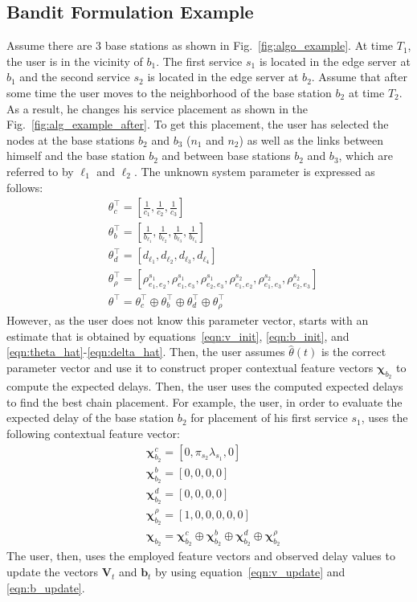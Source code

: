\subsection{Bandit Formulation Example}
Assume there are $3$ base stations as shown in Fig.~\ref{fig:algo_example}. At time $T_1$, the user is in the vicinity of $b_1$. The first service $s_1$ is located in the edge server at $b_1$ and the second service $s_2$ is located in the edge server at $b_2$. Assume that after some time the user moves to the neighborhood of the base station $b_2$ at time $T_2$. As a result, he changes his service placement as shown in the  Fig.~\ref{fig:alg_example_after}. To get this placement, the user has selected the nodes at the base stations $b_2$ and $b_3$ ($n_1$ and $n_2$) as well as the links between himself and the base station $b_2$ and between base stations $b_2$ and $b_3$, which are referred to by $\ell_1$ and $\ell_2$. The unknown system parameter is expressed as follows:
\begin{align*}
	& \theta_{c}^{\intercal} = [\frac{1}{c_1}, \frac{1}{c_2}, \frac{1}{c_3}] \\
	& \theta_{b}^{\intercal} = [\frac{1}{b_{\ell_1}}, \frac{1}{b_{\ell_2}}, \frac{1}{b_{\ell_3}}, \frac{1}{b_{\ell_4}}] \\
	& \theta_{d}^{\intercal} = [d_{\ell_1}, d_{\ell_2}, d_{\ell_3}, d_{\ell_4}] \\
	& \theta_{\rho}^{\intercal} = [\rho_{e_1,e_2}^{s_1}, \rho_{e_1,e_3}^{s_1}, \rho_{e_2,e_3}^{s_1}, \rho_{e_1,e_2}^{s_2}, \rho_{e_1,e_3}^{s_2}, \rho_{e_2,e_3}^{s_2}] \\
	& \theta^{\intercal} = \theta_{c}^{\intercal} \oplus \theta_{b}^{\intercal} \oplus \theta_{d}^{\intercal} \oplus \theta_{\rho}^{\intercal}
\end{align*}
However, as the user does not know this parameter vector, starts with an estimate that is obtained by equations~\eqref{eqn:v_init}, \eqref{eqn:b_init}, and \eqref{eqn:theta_hat}-\eqref{eqn:delta_hat}.
Then, the user assumes $\hat{\theta}(t)$ is the correct parameter vector and use it to construct proper contextual feature vectors $\pmb{\chi}_{b_{2}}$ to compute the expected delays. Then, the user uses the computed expected delays to find the best chain placement. For example, the user, in order to evaluate the expected delay of the base station $b_2$ for placement of his first service $s_1$, uses the following contextual feature vector:
\begin{align*}
	& \pmb{\chi}_{b_{2}}^{c} = [0, \pi_{s_{2}}\lambda_{s_1}, 0] \\
	& \pmb{\chi}_{b_{2}}^{b} = [0, 0, 0, 0] \\
	& \pmb{\chi}_{b_{2}}^{d} = [0, 0, 0, 0] \\
	& \pmb{\chi}_{b_{2}}^{\rho} = [1, 0, 0, 0, 0, 0] \\
	& \pmb{\chi}_{b_{2}} = \pmb{\chi}_{b_{2}}^{c} \oplus \pmb{\chi}_{b_{2}}^{b} \oplus \pmb{\chi}_{b_{2}}^{d} \oplus \pmb{\chi}_{b_{2}}^{\rho}
\end{align*}
The user, then, uses the employed feature vectors and observed delay values to update the vectors $\pmb{V}_{t}$ and $\pmb{b}_{t}$ by using equation~\eqref{eqn:v_update} and \eqref{eqn:b_update}.

